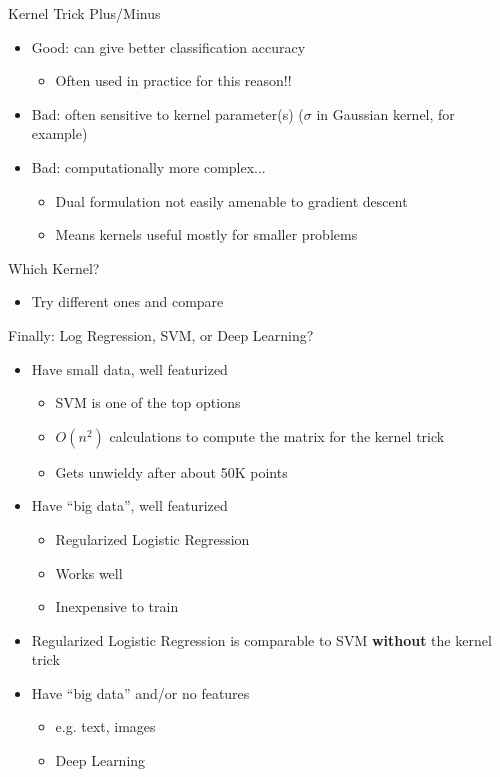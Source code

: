 \documentclass[aspectratio=169]{beamer}
\begin{document}
\begin{frame}{Kernel Trick Plus/Minus}

\begin{itemize}
\item Good: can give better classification accuracy
	\begin{itemize}
	\item Often used in practice for this reason!!
	\end{itemize}
\item Bad: often sensitive to kernel parameter(s) ($\sigma$ in Gaussian kernel, for example)
\item Bad: computationally more complex... 
	\begin{itemize}
	\item Dual formulation not easily amenable to gradient descent
	\item Means kernels useful mostly for smaller problems
	\end{itemize}
\end{itemize}
\end{frame}
\begin{frame}{Which Kernel?}

\begin{itemize}
\item Try different ones and compare %
\end{itemize}
\end{frame}
\begin{frame}{Finally: Log Regression,  SVM, or Deep Learning?}

\begin{itemize}
\item Have small data, well featurized
	\begin{itemize}
	\item SVM is one of the top options %
	\item $O(n^2)$ calculations to compute the matrix for the kernel trick
	\item Gets unwieldy after about 50K points
	\end{itemize}
\item Have ``big data'', well featurized
	\begin{itemize}
	\item Regularized Logistic Regression 
	\item Works well
	\item Inexpensive to train
	\end{itemize}
\item Regularized Logistic Regression is comparable to SVM \textbf{without} the kernel trick
\item Have ``big data'' and/or no features
	\begin{itemize}
	\item e.g. text, images
	\item Deep Learning
	\end{itemize}
\end{itemize}
\end{frame}
\end{document}
